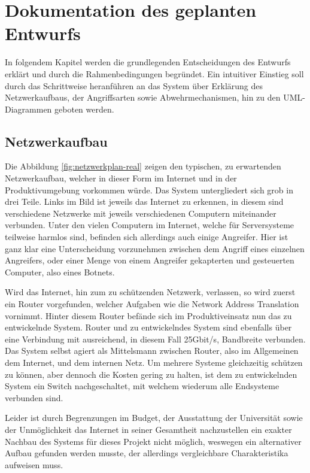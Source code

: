 \documentclass[../review_1.tex]{subfiles}
\begin{document}
\chapter{Dokumentation des geplanten Entwurfs}\thispagestyle{fancy}
In folgendem Kapitel werden die grundlegenden Entscheidungen des Entwurfs erklärt und durch die Rahmenbedingungen begründet. Ein intuitiver Einstieg soll durch das Schrittweise heranführen an das System über Erklärung des Netzwerkaufbaus, der Angriffsarten sowie Abwehrmechanismen, hin zu den UML-Diagrammen geboten werden. 

\section{Netzwerkaufbau}
Die Abbildung \ref{fig:netzwerkplan-real} zeigen den typischen, zu erwartenden Netzwerkaufbau, welcher in dieser Form im Internet und in der Produktivumgebung vorkommen würde. Das System untergliedert sich grob in drei Teile. Links im Bild ist jeweils das Internet zu erkennen, in diesem sind verschiedene Netzwerke mit jeweils verschiedenen Computern miteinander verbunden. Unter den vielen Computern im Internet, welche für Serversysteme teilweise harmlos sind, befinden sich allerdings auch einige Angreifer. Hier ist ganz klar eine Unterscheidung vorzunehmen zwischen dem Angriff eines einzelnen Angreifers, oder einer Menge von einem Angreifer gekapterten und gesteuerten Computer, also eines Botnets. 

Wird das Internet, hin zum zu schützenden Netzwerk, verlassen, so wird zuerst ein Router vorgefunden, welcher Aufgaben wie die Network Address Translation vornimmt. Hinter diesem Router befände sich im Produktiveinsatz nun das zu entwickelnde System. Router und zu entwickelndes System sind ebenfalls über eine Verbindung mit ausreichend, in diesem Fall 25Gbit/s, Bandbreite verbunden. Das System selbst agiert als Mittelsmann zwischen Router, also im Allgemeinen dem Internet, und dem internen Netz. Um mehrere Systeme gleichzeitig schützen zu können, aber dennoch die Kosten gering zu halten, ist dem zu entwickelnden System ein Switch nachgeschaltet, mit welchem wiederum alle Endsysteme verbunden sind.

Leider ist durch Begrenzungen im Budget, der Ausstattung der Universität sowie der Unmöglichkeit das Internet in seiner Gesamtheit nachzustellen ein exakter Nachbau des Systems für dieses Projekt nicht möglich, weswegen ein alternativer Aufbau gefunden werden musste, der allerdings vergleichbare Charakteristika aufweisen muss.
\end{document}
